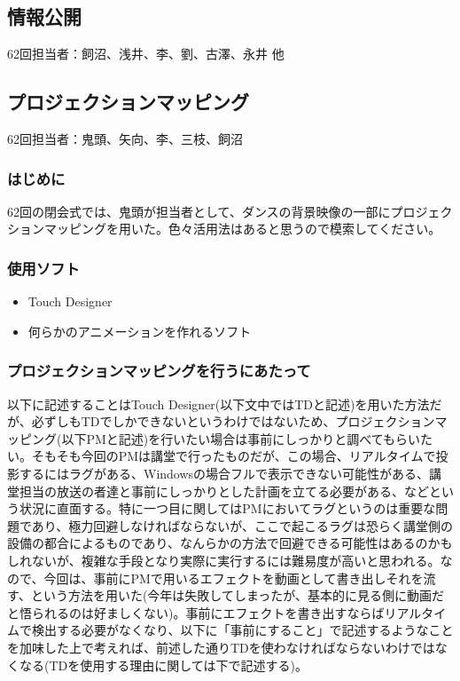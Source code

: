 \documentclass[dvipdfmx,jb5]{jarticle}
\begin{document}
 \subsection{情報公開}
62回担当者：飼沼、浅井、李、劉、古澤、永井 他

\subsection{プロジェクションマッピング}
62回担当者：鬼頭、矢向、李、三枝、飼沼
\subsubsection{はじめに}
62回の閉会式では、鬼頭が担当者として、ダンスの背景映像の一部にプロジェクションマッピングを用いた。色々活用法はあると思うので模索してください。

\subsubsection{使用ソフト}
\begin{itemize}
  \item Touch Designer
  \item 何らかのアニメーションを作れるソフト
\end{itemize}

\subsubsection{プロジェクションマッピングを行うにあたって}
以下に記述することはTouch Designer(以下文中ではTDと記述)を用いた方法だが、必ずしもTDでしかできないというわけではないため、プロジェクションマッピング(以下PMと記述)を行いたい場合は事前にしっかりと調べてもらいたい。そもそも今回のPMは講堂で行ったものだが、この場合、リアルタイムで投影するにはラグがある、Windowsの場合フルで表示できない可能性がある、講堂担当の放送の者達と事前にしっかりとした計画を立てる必要がある、などという状況に直面する。特に一つ目に関してはPMにおいてラグというのは重要な問題であり、極力回避しなければならないが、ここで起こるラグは恐らく講堂側の設備の都合によるものであり、なんらかの方法で回避できる可能性はあるのかもしれないが、複雑な手段となり実際に実行するには難易度が高いと思われる。なので、今回は、事前にPMで用いるエフェクトを動画として書き出しそれを流す、という方法を用いた(今年は失敗してしまったが、基本的に見る側に動画だと悟られるのは好ましくない)。事前にエフェクトを書き出すならばリアルタイムで検出する必要がなくなり、以下に「事前にすること」で記述するようなことを加味した上で考えれば、前述した通りTDを使わなければならないわけではなくなる(TDを使用する理由に関しては下で記述する)。
\end{document}
